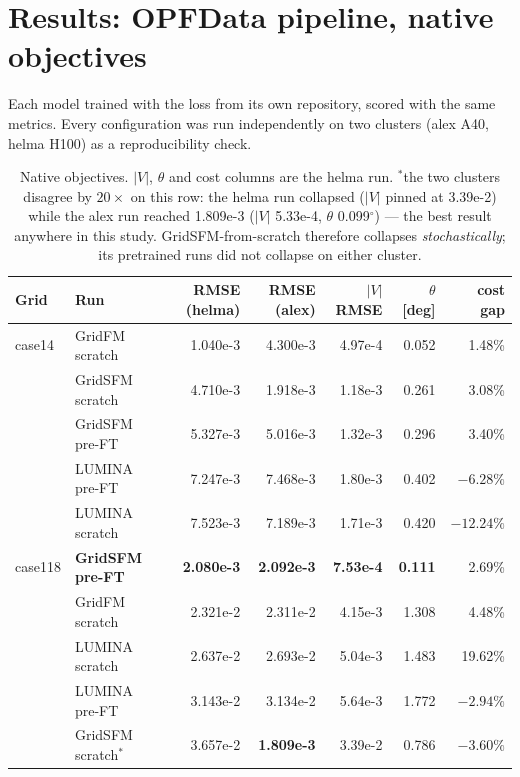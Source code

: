 \documentclass[10pt]{article}
\begin{document}
\section{Results: OPFData pipeline, native objectives}
\label{sec:native}

Each model trained with the loss from its own repository, scored with the same
metrics. Every configuration was run independently on two clusters (alex A40,
helma H100) as a reproducibility check.

\begin{table}[H]
\centering
\small
\begin{tabular}{llrrrrr}
\toprule
Grid & Run & RMSE (helma) & RMSE (alex) & \(|V|\) RMSE & \(\theta\) [deg] & cost gap \\
\midrule
case14 & GridFM scratch  & 1.040e-3 & 4.300e-3 & 4.97e-4 & 0.052 & 1.48\% \\
       & GridSFM scratch & 4.710e-3 & 1.918e-3 & 1.18e-3 & 0.261 & 3.08\% \\
       & GridSFM pre-FT  & 5.327e-3 & 5.016e-3 & 1.32e-3 & 0.296 & 3.40\% \\
       & LUMINA pre-FT   & 7.247e-3 & 7.468e-3 & 1.80e-3 & 0.402 & \(-6.28\%\) \\
       & LUMINA scratch  & 7.523e-3 & 7.189e-3 & 1.71e-3 & 0.420 & \(-12.24\%\) \\
\midrule
case118 & \textbf{GridSFM pre-FT} & \textbf{2.080e-3} & \textbf{2.092e-3} & \textbf{7.53e-4} & \textbf{0.111} & 2.69\% \\
        & GridFM scratch  & 2.321e-2 & 2.311e-2 & 4.15e-3 & 1.308 & 4.48\% \\
        & LUMINA scratch  & 2.637e-2 & 2.693e-2 & 5.04e-3 & 1.483 & 19.62\% \\
        & LUMINA pre-FT   & 3.143e-2 & 3.134e-2 & 5.64e-3 & 1.772 & \(-2.94\%\) \\
        & GridSFM scratch$^{\ast}$ & 3.657e-2 & \textbf{1.809e-3} & 3.39e-2 & 0.786 & \(-3.60\%\) \\
\bottomrule
\end{tabular}
\caption{Native objectives. \(|V|\), \(\theta\) and cost columns are the helma
run. $^{\ast}$the two clusters disagree by \(20\times\) on this row: the helma
run collapsed (\(|V|\) pinned at 3.39e-2) while the alex run reached 1.809e-3
(\(|V|\) 5.33e-4, \(\theta\) 0.099\(^\circ\)) --- the best result anywhere in
this study. GridSFM-from-scratch therefore collapses \emph{stochastically}; its
pretrained runs did not collapse on either cluster.}
\end{table}
\end{document}
